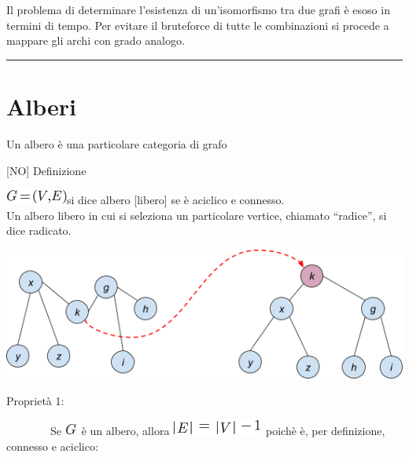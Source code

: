 \documentclass{article}
\begin{document}
{}

{Il problema di determinare l'esistenza di un'isomorfismo tra due grafi
è esoso in termini di tempo. Per evitare il bruteforce di tutte le
combinazioni si procede a mappare gli archi con grado analogo.}

\begin{center}\rule{0.5\linewidth}{\linethickness}\end{center}

\hypertarget{h.jnoiha3cadu8}{\section{\texorpdfstring{{Alberi}}{Alberi}}\label{h.jnoiha3cadu8}}

{Un albero è una particolare categoria di grafo}

{}

{}

{{[}NO{]} Definizione}

\includegraphics{images/image439.png}{si dice albero {[}libero{]} se è
aciclico e connesso.\\
\hspace*{0.333em}\hspace*{0.333em}\hspace*{0.333em}\hspace*{0.333em}\hspace*{0.333em}\hspace*{0.333em}\hspace*{0.333em}\hspace*{0.333em}Un
albero libero in cui si seleziona un particolare vertice, chiamato
``radice'', si dice }{radicato}{.}

{\includegraphics{images/image533.png}}

{}

{}

{}

{Proprietà 1:}

{~~~~~~~~}{Se }\includegraphics{images/image340.png}{~è un albero,
allora }\includegraphics{images/image375.png}{~poichè è, per
definizione, connesso e aciclico:}
\end{document}
